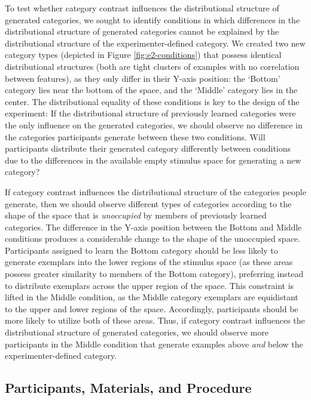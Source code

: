 \documentclass[12pt]{article}
\begin{document}
\begin{flushleft}
To test whether category contrast influences the distributional structure of
generated categories, we sought to identify conditions in which differences in
the distributional structure of generated categories cannot be explained by the
distributional structure of the experimenter-defined category. We created two
new category types (depicted in Figure \ref{fig:e2-conditions}) that possess
identical distributional structures (both are tight clusters of examples with no
correlation between features), as they only differ in their Y-axis position: the
`Bottom' category lies near the bottom of the space, and the `Middle' category
lies in the center. The distributional equality of these conditions is key to
the design of the experiment: If the distributional structure of previously
learned categories were the only influence on the generated categories, we
should observe no difference in the categories participants generate between
these two conditions. Will participants distribute their generated category
differently between conditions due to the differences in the available empty
stimulus space for generating a new category?

If category contrast influences the distributional structure of the categories
people generate, then we should observe different types of categories according
to the shape of the space that is {\em unoccupied} by members of previously
learned categories. The difference in the Y-axis position between the Bottom and
Middle conditions produces a considerable change to the shape of the unoccupied
space. Participants assigned to learn the Bottom category should be less likely
to generate exemplars into the lower regions of the stimulus space (as these
areas possess greater similarity to members of the Bottom category), preferring
instead to distribute exemplars across the upper region of the space. This
constraint is lifted in the Middle condition, as the Middle category exemplars
are equidistant to the upper and lower regions of the space. Accordingly,
participants should be more likely to utilize both of these areas. Thus, if
category contrast influences the distributional structure of generated
categories, we should observe more participants in the Middle condition that
generate examples above {\em and} below the experimenter-defined category.


\subsection{Participants, Materials, and Procedure}


\end{flushleft}
\end{document}
